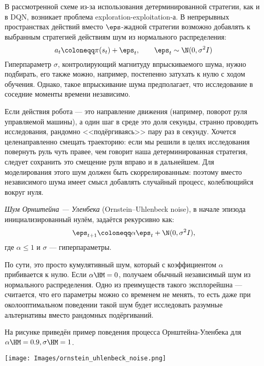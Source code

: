 В рассмотренной схеме из-за использования детерминированной стратегии, как и в DQN, возникает проблема exploration-exploitation-а. В непрерывных пространствах действий вместо $\eps$-жадной стратегии возможно добавлять к выбранным стратегией действиям шум из нормального распределения:
$$a_t \coloneqq \pi(s_t) + \eps_t, \qquad \eps_t \sim \N(0, \sigma^2I)$$
Гиперпараметр $\sigma$, контролирующий магнитуду впрыскиваемого шума, нужно подбирать, его также можно, например, постепенно затухать к нулю с ходом обучения. Однако, такое впрыскивание шума предполагает, что исследование в соседние моменты времени независимо.

\begin{example}
Если действия робота --- это направление движения (например, поворот руля управляемой машины), а один шаг в среде это доля секунды, странно проводить исследования, рандомно <<подёргиваясь>> пару раз в секунду. Хочется целенаправленно смещать траекторию: если мы решили в целях исследования повернуть руль чуть правее, чем говорит наша детерминированная стратегия, следует сохранить это смещение руля вправо и в дальнейшем. Для моделирования этого шум должен быть скоррелированным: поэтому вместо независимого шума имеет смысл добавлять случайный процесс, колеблющийся вокруг нуля.
\end{example}

\begin{definition}
\emph{Шум Орнштейна — Уленбека} (Ornstein–Uhlenbeck noise), в начале эпизода инициализированный нулём, задаётся рекурсивно как:
$$\eps_{t + 1} \coloneqq \alpha \eps_t + \N(0, \sigma^2I),$$
где $\alpha \le 1$ и $\sigma$ --- гиперпараметры.
\end{definition}

По сути, это просто кумулятивный шум, который с коэффициентом $\alpha$ прибивается к нулю. Если $\alpha \HM= 0$, получаем обычный независимый шум из нормального распределения. Одно из преимуществ такого эксплорейшна --- считается, что его параметры можно со временем не менять, то есть даже при околооптимальном поведении такой шум будет исследовать разумные альтернативы вместо рандомных подёргиваний.

\begin{example}
На рисунке приведён пример поведения процесса Орнштейна-Уленбека для $\alpha \HM= 0.9, \sigma \HM= 1$.
\begin{center}
    \texttt{[image: Images/ornstein\_uhlenbeck\_noise.png]}
\end{center}
\end{example}

